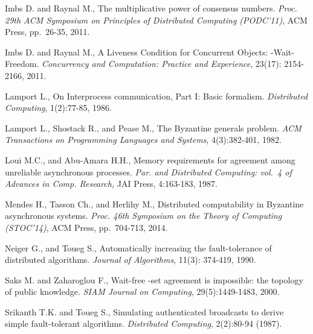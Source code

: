 \documentclass[11pt,letterpaper]{article}
\begin{document}
\begin{thebibliography}{99}
{
Imbs D. and Raynal M.,
The multiplicative power of consensus numbers.
{\it Proc.  29th ACM Symposium on Principles of Distributed Computing
(PODC'11)}, ACM Press, pp.~26-35, 2011.

Imbs D. and Raynal M.,
A Liveness Condition for Concurrent Objects: -Wait-Freedom.
{\it Concurrency and Computation: Practice and Experience},
 23(17): 2154-2166, 2011.






Lamport L.,
On Interprocess communication, Part I: Basic formalism.
{\it Distributed Computing}, 1(2):77-85, 1986.


Lamport L., Shostack R., and Pease M., The Byzantine generals problem.
{\it ACM Transactions on Programming Languages and Systems},
4(3):382-401, 1982.


Loui M.C., and Abu-Amara H.H., Memory requirements for agreement
among unreliable asynchronous processes.
{\it Par. and Distributed Computing: vol.~4 of Advances
in Comp. Research,} JAI Press, 4:163-183, 1987.



Mendes H., Tasson Ch., and Herlihy M.,
Distributed computability in Byzantine asynchronous systems.
{\it Proc.  46th  Symposium on the Theory of Computing (STOC'14)},
ACM Press, pp.~704-713, 2014.

Neiger G., and Toueg S.,
Automatically increasing the fault-tolerance of distributed algorithms.
{\it Journal of  Algorithms}, 11(3): 374-419, 1990.




Saks M. and Zaharoglou F.,
Wait-free -set agreement is impossible: the topology of public knowledge.
{\em SIAM Journal on Computing}, 29(5):1449-1483, 2000.

Srikanth T.K. and  Toueg S., 
Simulating authenticated broadcasts to derive simple fault-tolerant algorithms.
{\it  Distributed Computing}, 2(2):80-94  (1987).

}


\end{thebibliography}
\end{document}
